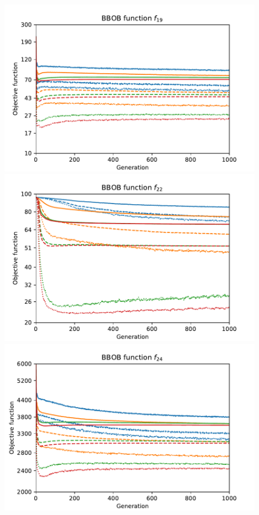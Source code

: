 \begin{figure}[ht!]
    \begin{minipage}[t]{0.32\textwidth}
        \centering
        \includegraphics[width=\textwidth]{img/runs/fitness_pso2011_f19.pdf}
    \end{minipage}
    \hfill
    \begin{minipage}[t]{0.32\textwidth}
        \centering
        \includegraphics[width=\textwidth]{img/runs/fitness_pso2011_f22.pdf}
    \end{minipage}
    \hfill
    \begin{minipage}[t]{0.32\textwidth}
        \centering
        \includegraphics[width=\textwidth]{img/runs/fitness_pso2011_f24.pdf}
    \end{minipage}


\end{figure}
